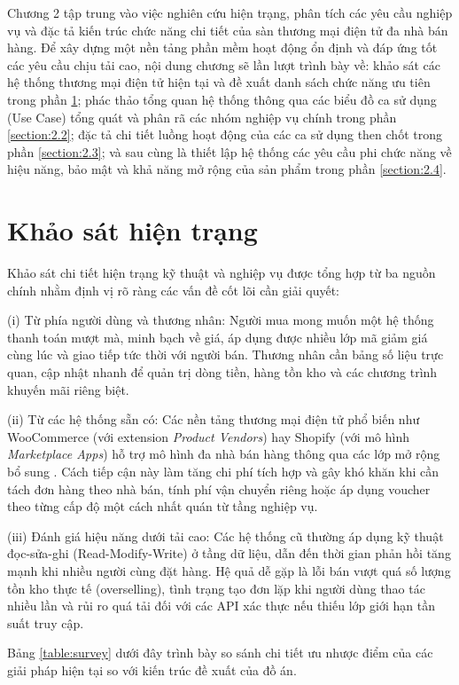 \documentclass[../DoAn.tex]{subfiles}
\begin{document}
Chương 2 tập trung vào việc nghiên cứu hiện trạng, phân tích các yêu cầu nghiệp vụ và đặc tả kiến trúc chức năng chi tiết của sàn thương mại điện tử đa nhà bán hàng. Để xây dựng một nền tảng phần mềm hoạt động ổn định và đáp ứng tốt các yêu cầu chịu tải cao, nội dung chương sẽ lần lượt trình bày về: khảo sát các hệ thống thương mại điện tử hiện tại và đề xuất danh sách chức năng ưu tiên trong phần \ref{section:2.1}; phác thảo tổng quan hệ thống thông qua các biểu đồ ca sử dụng (Use Case) tổng quát và phân rã các nhóm nghiệp vụ chính trong phần \ref{section:2.2}; đặc tả chi tiết luồng hoạt động của các ca sử dụng then chốt trong phần \ref{section:2.3}; và sau cùng là thiết lập hệ thống các yêu cầu phi chức năng về hiệu năng, bảo mật và khả năng mở rộng của sản phẩm trong phần \ref{section:2.4}.

\section{Khảo sát hiện trạng}
\label{section:2.1}
Khảo sát chi tiết hiện trạng kỹ thuật và nghiệp vụ được tổng hợp từ ba nguồn chính nhằm định vị rõ ràng các vấn đề cốt lõi cần giải quyết:

(i) Từ phía người dùng và thương nhân: Người mua mong muốn một hệ thống thanh toán mượt mà, minh bạch về giá, áp dụng được nhiều lớp mã giảm giá cùng lúc và giao tiếp tức thời với người bán. Thương nhân cần bảng số liệu trực quan, cập nhật nhanh để quản trị dòng tiền, hàng tồn kho và các chương trình khuyến mãi riêng biệt.

(ii) Từ các hệ thống sẵn có: Các nền tảng thương mại điện tử phổ biến như WooCommerce (với extension \textit{Product Vendors}) hay Shopify (với mô hình \textit{Marketplace Apps}) hỗ trợ mô hình đa nhà bán hàng thông qua các lớp mở rộng bổ sung \cite{woocommerce-multivendor}\cite{shopify-marketplace}. Cách tiếp cận này làm tăng chi phí tích hợp và gây khó khăn khi cần tách đơn hàng theo nhà bán, tính phí vận chuyển riêng hoặc áp dụng voucher theo từng cấp độ một cách nhất quán từ tầng nghiệp vụ.

(iii) Đánh giá hiệu năng dưới tải cao: Các hệ thống cũ thường áp dụng kỹ thuật đọc-sửa-ghi (Read-Modify-Write) ở tầng dữ liệu, dẫn đến thời gian phản hồi tăng mạnh khi nhiều người cùng đặt hàng. Hệ quả dễ gặp là lỗi bán vượt quá số lượng tồn kho thực tế (overselling), tình trạng tạo đơn lặp khi người dùng thao tác nhiều lần và rủi ro quá tải đối với các API xác thực nếu thiếu lớp giới hạn tần suất truy cập.

Bảng \ref{table:survey} dưới đây trình bày so sánh chi tiết ưu nhược điểm của các giải pháp hiện tại so với kiến trúc đề xuất của đồ án.
\end{document}
